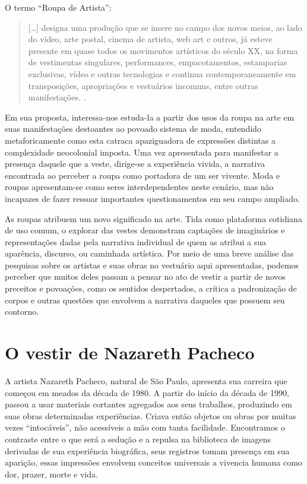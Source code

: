 \begin{refsection}
    O termo ``Roupa de Artista'':

    \begin{quotation}
        [\dots] designa uma produção que se insere no campo dos novos meios, ao lado do vídeo, arte postal, cinema de artista, web art e outros, já esteve presente em quase todos os movimentos artísticos do século XX, na forma de vestimentas singulares, performances, empacotamentos, estamparias exclusivas, vídeo e outras tecnologias e continua contemporaneamente em transposições, apropriações e vestuários incomuns, entre outras manifestações. \cite[p.~9]{Costa2009Roupa}.
    \end{quotation}

    Em sua proposta, interessa-nos estuda-la a partir dos usos da roupa na arte em suas manifestações destoantes ao povoado sistema de moda, entendido metaforicamente como esta catraca apaziguadora de expressões distintas a complexidade neocolonial imposta. Uma vez apresentada para manifestar a presença daquele que a veste, dirige-se a experiência vivida, a narrativa encontrada ao perceber a roupa como portadora de um ser vivente. Moda e roupas apresentam-se como seres interdependentes neste cenário, mas não incapazes de fazer ressoar importantes questionamentos em seu campo ampliado. 

    As roupas atribuem um novo significado na arte. Tida como plataforma cotidiana de uso comum, o explorar das vestes demonstram captações de imaginários e representações dadas pela narrativa individual de quem as atribui a sua aparência, discurso, ou caminhada artística. Por meio de uma breve análise das pesquisas sobre os artistas e suas obras no vestuário aqui apresentadas, podemos perceber que muitos deles passam a pensar no ato de vestir a partir de novos preceitos e povoações, como os sentidos despertados, a crítica a padronização de corpos e outras questões que envolvem a narrativa daqueles que possuem seu contorno. 

    \section{O vestir de Nazareth Pacheco}

    A artista Nazareth Pacheco, natural de São Paulo, apresenta sua carreira que começou em meados da década de 1980. A partir do início da década de 1990, passou a usar materiais cortantes agregados aos seus trabalhos, produzindo em suas obras determinadas experiências. Criava então objetos ou obras por muitas vezes ``intocáveis'', não acessíveis a mão com tanta facilidade. Encontramos o contraste entre o que será a sedução e a repulsa na biblioteca de imagens derivadas de sua experiência biográfica, seus registros tomam presença em sua aparição, essas impressões envolvem conceitos universais a vivencia humana como dor, prazer, morte e vida.  


\end{refsection}

